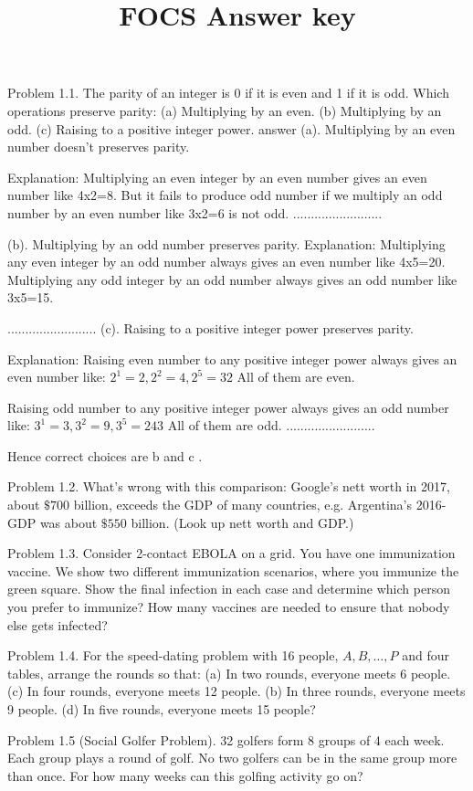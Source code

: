 \documentclass[10pt]{article}
\title{FOCS Answer key }
\author{}
\date{}
\begin{document}
\maketitle
Problem 1.1. The parity of an integer is 0 if it is even and 1 if it is odd. Which operations preserve parity:
(a) Multiplying by an even.
(b) Multiplying by an odd.
(c) Raising to a positive integer power.
answer
(a). Multiplying by an even number doesn't preserves parity.

Explanation:
Multiplying an even integer by an even number gives an even number like 4x2=8. But it fails to produce odd number if we multiply an odd number by an even number like 3x2=6 is not odd.
.........................

(b). Multiplying by an odd number preserves parity. Explanation: Multiplying any even integer by an odd number always gives an even number like 4x5=20.
Multiplying any odd integer by an odd number always gives an odd number like 3x5=15.

.........................
(c). Raising to a positive integer power preserves parity.

Explanation: Raising even number to any positive integer power always gives an even number like:
$2^1=2, 2^2=4, 2^5=32$
All of them are even.

Raising odd number to any positive integer power always gives an odd number like:
$3^1=3, 3^2=9, 3^5=243$
All of them are odd.
.........................

Hence correct choices are b and c .


Problem 1.2. What's wrong with this comparison: Google's nett worth in 2017, about $\$ 700$ billion, exceeds the GDP of many countries, e.g. Argentina's 2016-GDP was about $\$ 550$ billion. (Look up nett worth and GDP.)

Problem 1.3. Consider 2-contact EBOLA on a grid. You have one immunization vaccine. We show two different immunization scenarios, where you immunize the green square. Show the final infection in each case and determine which person you prefer to immunize? How many vaccines are needed to ensure that nobody else gets infected?

Problem 1.4. For the speed-dating problem with 16 people, $A, B, \ldots, P$ and four tables, arrange the rounds so that:
(a) In two rounds, everyone meets 6 people.
(c) In four rounds, everyone meets 12 people.
(b) In three rounds, everyone meets 9 people.
(d) In five rounds, everyone meets 15 people?

Problem 1.5 (Social Golfer Problem). 32 golfers form 8 groups of 4 each week. Each group plays a round of golf. No two golfers can be in the same group more than once. For how many weeks can this golfing activity go on?
\end{document}
